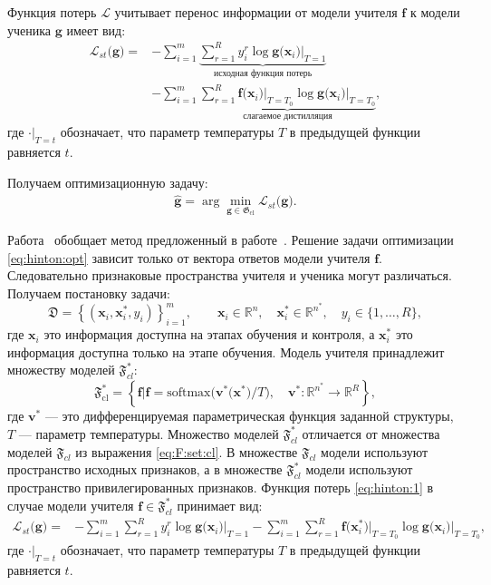 Функция потерь $\mathcal{L}$ учитывает перенос информации от модели учителя $\mathbf{f}$ к модели ученика $\mathbf{g}$ имеет вид:
\[
\label{eq:hinton:1}
\begin{aligned}
   \mathcal{L}_{st}\bigr(\mathbf{g}\bigr) = &-\sum_{i=1}^{m}\underbrace{{\sum_{r=1}^{R}y^r_i\log\mathbf{g}\bigr(\mathbf{x}_i\bigr)\bigr|_{T=1}}}_{\text{исходная функция потерь}}\\
   &-\sum_{i=1}^{m}\underbrace{{\sum_{r=1}^{R}\mathbf{f}\bigr(\mathbf{x}_i\bigr)\bigr|_{T=T_0}\log\mathbf{g}\bigr(\mathbf{x}_i\bigr)\bigr|_{T=T_0}}}_{\text{слагаемое дистилляция}},
\end{aligned}
\]
где $\cdot\bigr|_{T=t}$ обозначает, что параметр температуры $T$ в предыдущей функции равняется $t$.

Получаем оптимизационную задачу:
\[
\label{eq:hinton:opt}
\begin{aligned}
   \hat{\mathbf{g}} = \arg\min_{\mathbf{g} \in \mathfrak{G}_{\text{cl}}} \mathcal{L}_{st}\bigr(\mathbf{g}\bigr).
\end{aligned}
\]

Работа~\cite{Lopez2016} обобщает метод предложенный в работе~\cite{Hinton2015}. Решение задачи оптимизации \eqref{eq:hinton:opt} зависит только от вектора ответов модели учителя $\mathbf{f}$. Следовательно признаковые пространства учителя и ученика могут различаться. Получаем постановку задачи:
\[
    \mathfrak{D} = \left\{\left(\mathbf{x}_i, \mathbf{x}^*_i, y_i\right)\right\}_{i=1}^{m}, \qquad \mathbf{x}_i \in \mathbb{R}^{n}, \quad \mathbf{x}^*_i \in \mathbb{R}^{n^*}, \quad y_i \in \{1, \ldots, R\},
\]
где $\mathbf{x}_i$ это информация доступна на этапах обучения и контроля, а $\mathbf{x}^*_i$ это информация доступна только на этапе обучения. Модель учителя принадлежит множеству моделей $\mathfrak{F}_{cl}^*$:
\[
\label{eq:F:set:cl:priv}
\mathfrak{F}_{\text{cl}}^* = \left\{\mathbf{f}| \mathbf{f} = \text{softmax}\bigr(\mathbf{v}^*\bigr(\mathbf{x}^*\bigr)/T\bigr), \quad \mathbf{v}^*: \mathbb{R}^{n^*} \to \mathbb{R}^R \right\},
\]
где $\mathbf{v}^*$ --- это дифференцируемая параметрическая функция заданной структуры, $T$ --- параметр температуры. Множество моделей $\mathfrak{F}_{cl}^*$ отличается от множества моделей $\mathfrak{F}_{cl}$ из выражения \eqref{eq:F:set:cl}. В множестве $\mathfrak{F}_{cl}$ модели используют пространство исходных признаков, а в множестве $\mathfrak{F}_{cl}^*$ модели используют пространство привилегированных признаков. Функция потерь \eqref{eq:hinton:1} в случае модели учителя $\mathbf{f} \in \mathfrak{F}_{cl}^*$ принимает вид:
\[
\label{eq:hinton:L:new}
\begin{aligned}
   \mathcal{L}_{st}\bigr(\mathbf{g}\bigr) = &-\sum_{i=1}^{m}{\sum_{r=1}^{R}y^r_i\log\mathbf{g}\bigr(\mathbf{x}_i\bigr)\bigr|_{T=1}}-\sum_{i=1}^{m}{\sum_{r=1}^{R}\mathbf{f}\bigr(\mathbf{x}^*_i\bigr)\bigr|_{T=T_0}\log\mathbf{g}\bigr(\mathbf{x}_i\bigr)\bigr|_{T=T_0}},
\end{aligned}
\]
где $\cdot\bigr|_{T=t}$ обозначает, что параметр температуры $T$ в предыдущей функции равняется $t$.

